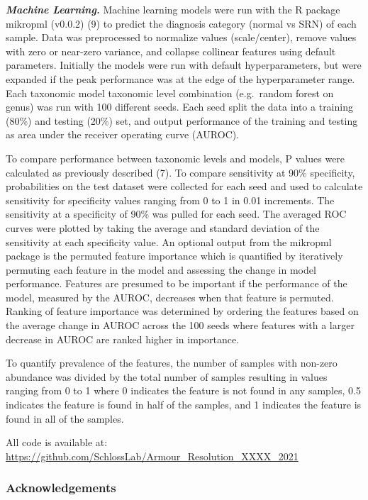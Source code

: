 \documentclass[
]{article}
\begin{document}
\textbf{\emph{Machine Learning.}} Machine learning models were run with
the R package mikropml (v0.0.2) (9) to predict the diagnosis category
(normal vs SRN) of each sample. Data was preprocessed to normalize
values (scale/center), remove values with zero or near-zero variance,
and collapse collinear features using default parameters. Initially the
models were run with default hyperparameters, but were expanded if the
peak performance was at the edge of the hyperparameter range. Each
taxonomic model taxonomic level combination (e.g.~random forest on
genus) was run with 100 different seeds. Each seed split the data into a
training (80\%) and testing (20\%) set, and output performance of the
training and testing as area under the receiver operating curve (AUROC).

To compare performance between taxonomic levels and models, P values
were calculated as previously described (7). To compare sensitivity at
90\% specificity, probabilities on the test dataset were collected for
each seed and used to calculate sensitivity for specificity values
ranging from 0 to 1 in 0.01 increments. The sensitivity at a specificity
of 90\% was pulled for each seed. The averaged ROC curves were plotted
by taking the average and standard deviation of the sensitivity at each
specificity value. An optional output from the mikropml package is the
permuted feature importance which is quantified by iteratively permuting
each feature in the model and assessing the change in model performance.
Features are presumed to be important if the performance of the model,
measured by the AUROC, decreases when that feature is permuted. Ranking
of feature importance was determined by ordering the features based on
the average change in AUROC across the 100 seeds where features with a
larger decrease in AUROC are ranked higher in importance.

To quantify prevalence of the features, the number of samples with
non-zero abundance was divided by the total number of samples resulting
in values ranging from 0 to 1 where 0 indicates the feature is not found
in any samples, 0.5 indicates the feature is found in half of the
samples, and 1 indicates the feature is found in all of the samples.

All code is available at:
\url{https://github.com/SchlossLab/Armour_Resolution_XXXX_2021}

\hypertarget{acknowledgements}{%
\subsubsection{Acknowledgements}\label{acknowledgements}}
\end{document}
